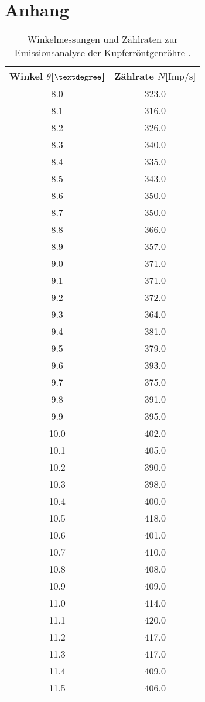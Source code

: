\section{Anhang}
\begin{table}\tiny
\caption{Winkelmessungen und Zählraten zur Emissionsanalyse der Kupferröntgenröhre \cite{hinweis}.}
\begin{minipage}{0.5\textwidth}
\centering
\label{tab:cuwerte1}
\begin{tabular}{c c}
    \toprule
    Winkel $\theta$[$\textdegree$] & Zählrate $N$[$\si{{\text{Imp}}\per\second}$]\\
    \midrule
8.0		&323.0\\
8.1		&316.0\\
8.2		&326.0\\
8.3		&340.0\\
8.4		&335.0\\
8.5		&343.0\\
8.6		&350.0\\
8.7		&350.0\\
8.8		&366.0\\
8.9		&357.0\\
9.0		&371.0\\
9.1		&371.0\\
9.2		&372.0\\
9.3		&364.0\\
9.4		&381.0\\
9.5		&379.0\\
9.6		&393.0\\
9.7		&375.0\\
9.8		&391.0\\
9.9		&395.0\\
10.0		&402.0\\
10.1		&405.0\\
10.2		&390.0\\
10.3		&398.0\\
10.4		&400.0\\
10.5		&418.0\\
10.6		&401.0\\
10.7		&410.0\\
10.8		&408.0\\
10.9		&409.0\\
11.0		&414.0\\
11.1		&420.0\\
11.2		&417.0\\
11.3		&417.0\\
11.4		&409.0\\
11.5		&406.0\\

\end{tabular}
\end{minipage}
\end{table}
